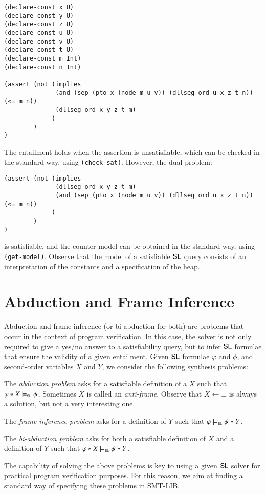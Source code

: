 \documentclass{llncs}
\begin{document}
\begin{verbatim}
(declare-const x U)
(declare-const y U)
(declare-const z U)
(declare-const u U)
(declare-const v U)
(declare-const t U)
(declare-const m Int)
(declare-const n Int)

(assert (not (implies 
              (and (sep (pto x (node m u v)) (dllseg_ord u x z t n)) (<= m n)) 
              (dllseg_ord x y z t m)
             )
        )
)
\end{verbatim}
The entailment holds when the assertion is unsatisfiable, which can be
checked in the standard way, using {\tt (check-sat)}. However, the
dual problem:
\begin{verbatim}
(assert (not (implies 
              (dllseg_ord x y z t m)
              (and (sep (pto x (node m u v)) (dllseg_ord u x z t n)) (<= m n)) 
             )
        )
)
\end{verbatim}
is satisfiable, and the counter-model can be obtained in the standard
way, using {\tt (get-model)}. Observe that the model of a satisfiable
$\mathsf{SL}$ query consists of an interpretation of the constants and a
specification of the heap. 

\section{Abduction and Frame Inference}

Abduction and frame inference (or bi-abduction for both) are problems
that occur in the context of program verification. In this case, the
solver is not only required to give a yes/no answer to a
satisfiability query, but to infer $\mathsf{SL}$ formulae that ensure the
validity of a given entailment. Given $\mathsf{SL}$ formulae $\varphi$ and
$\phi$, and second-order variables $X$ and $Y$, we consider the
following synthesis problems:


\begin{compactenum}
\item The \emph{abduction problem} asks for a satisfiable definition
  of a $X$ such that $\varphi * X \models_{\mathsf{\scriptscriptstyle{SL}}}
  \psi$. Sometimes $X$ is called an \emph{anti-frame}. Observe that $X
  \leftarrow \bot$ is always a solution, but not a very interesting
  one.
%
\item The \emph{frame inference problem} asks for a definition of $Y$
  such that $\varphi \models_{\mathsf{\scriptscriptstyle{SL}}} \psi * Y$.
%
\item The \emph{bi-abduction problem} asks for both a satisfiable
  definition of $X$ and a definition of $Y$ such that $\varphi * X
  \models_{\mathsf{\scriptscriptstyle{SL}}} \psi * Y$.
\end{compactenum}
The capability of solving the above problems is key to using a given
$\mathsf{SL}$ solver for practical program verification purposes. For this
reason, we aim at finding a standard way of specifying these problems
in SMT-LIB.
\end{document}
